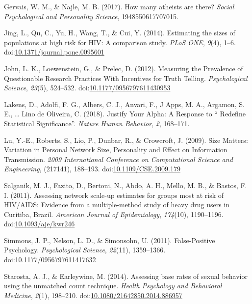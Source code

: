 \documentclass[,jou]{apa6}
\theoremstyle{definition}
\theoremstyle{definition}
\theoremstyle{definition}
\theoremstyle{remark}
\begin{document}
\hypertarget{ref-Gervais2017}{}
Gervais, W. M., \& Najle, M. B. (2017). How many atheists are there?
\emph{Social Psychological and Personality Science}, 1948550617707015.

\hypertarget{ref-Jing2014}{}
Jing, L., Qu, C., Yu, H., Wang, T., \& Cui, Y. (2014). Estimating the
sizes of populations at high risk for HIV: A comparison study.
\emph{PLoS ONE}, \emph{9}(4), 1--6.
doi:\href{https://doi.org/10.1371/journal.pone.0095601}{10.1371/journal.pone.0095601}

\hypertarget{ref-John2012}{}
John, L. K., Loewenstein, G., \& Prelec, D. (2012). Measuring the
Prevalence of Questionable Research Practices With Incentives for Truth
Telling. \emph{Psychological Science}, \emph{23}(5), 524--532.
doi:\href{https://doi.org/10.1177/0956797611430953}{10.1177/0956797611430953}

\hypertarget{ref-Lakensabc1860}{}
Lakens, D., Adolfi, F. G., Albers, C. J., Anvari, F., J Apps, M. A.,
Argamon, S. E., \ldots{} Lino de Oliveira, C. (2018). Justify Your
Alpha: A Response to `` Redefine Statistical Significance''.
\emph{Nature Human Behavior}, \emph{2}, 168--171.

\hypertarget{ref-Lu2009}{}
Lu, Y.-E., Roberts, S., Lio, P., Dunbar, R., \& Crowcroft, J. (2009).
Size Matters: Variation in Personal Network Size, Personality and Effect
on Information Transmission. \emph{2009 International Conference on
Computational Science and Engineering}, (217141), 188--193.
doi:\href{https://doi.org/10.1109/CSE.2009.179}{10.1109/CSE.2009.179}

\hypertarget{ref-Salganik2011}{}
Salganik, M. J., Fazito, D., Bertoni, N., Abdo, A. H., Mello, M. B., \&
Bastos, F. I. (2011). Assessing network scale-up estimates for groups
most at risk of HIV/AIDS: Evidence from a multiple-method study of heavy
drug users in Curitiba, Brazil. \emph{American Journal of Epidemiology},
\emph{174}(10), 1190--1196.
doi:\href{https://doi.org/10.1093/aje/kwr246}{10.1093/aje/kwr246}

\hypertarget{ref-Simmons2011}{}
Simmons, J. P., Nelson, L. D., \& Simonsohn, U. (2011). False-Positive
Psychology. \emph{Psychological Science}, \emph{22}(11), 1359--1366.
doi:\href{https://doi.org/10.1177/0956797611417632}{10.1177/0956797611417632}

\hypertarget{ref-Starosta2014}{}
Starosta, A. J., \& Earleywine, M. (2014). Assessing base rates of
sexual behavior using the unmatched count technique. \emph{Health
Psychology and Behavioral Medicine}, \emph{2}(1), 198--210.
doi:\href{https://doi.org/10.1080/21642850.2014.886957}{10.1080/21642850.2014.886957}
\end{document}
